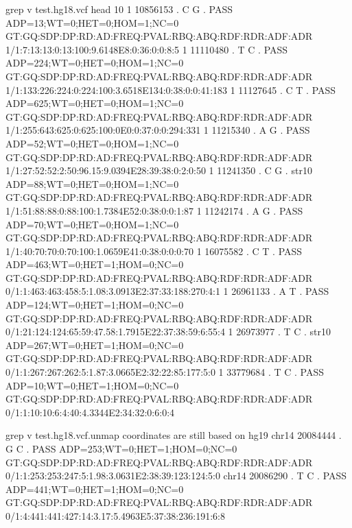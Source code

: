 \documentclass[letterpaper,10pt,english]{sphinxmanual}
\begin{document}
\begin{sphinxVerbatim}[commandchars=\\\{\}]
\PYGZdl{} grep \PYGZhy{}v \PYGZsq{}\PYGZsh{}\PYGZsq{} test.hg18.vcf  \textbar{}head \PYGZhy{}10
1      10856153        .       C       G       .       PASS    ADP=13;WT=0;HET=0;HOM=1;NC=0    GT:GQ:SDP:DP:RD:AD:FREQ:PVAL:RBQ:ABQ:RDF:RDR:ADF:ADR    1/1:7:13:13:0:13:100\PYGZpc{}:9.6148E\PYGZhy{}8:0:36:0:0:8:5
1      11110480        .       T       C       .       PASS    ADP=224;WT=0;HET=0;HOM=1;NC=0   GT:GQ:SDP:DP:RD:AD:FREQ:PVAL:RBQ:ABQ:RDF:RDR:ADF:ADR    1/1:133:226:224:0:224:100\PYGZpc{}:3.6518E\PYGZhy{}134:0:38:0:0:41:183
1      11127645        .       C       T       .       PASS    ADP=625;WT=0;HET=0;HOM=1;NC=0   GT:GQ:SDP:DP:RD:AD:FREQ:PVAL:RBQ:ABQ:RDF:RDR:ADF:ADR    1/1:255:643:625:0:625:100\PYGZpc{}:0E0:0:37:0:0:294:331
1      11215340        .       A       G       .       PASS    ADP=52;WT=0;HET=0;HOM=1;NC=0    GT:GQ:SDP:DP:RD:AD:FREQ:PVAL:RBQ:ABQ:RDF:RDR:ADF:ADR    1/1:27:52:52:2:50:96.15\PYGZpc{}:9.0394E\PYGZhy{}28:39:38:0:2:0:50
1      11241350        .       C       G       .       str10   ADP=88;WT=0;HET=0;HOM=1;NC=0    GT:GQ:SDP:DP:RD:AD:FREQ:PVAL:RBQ:ABQ:RDF:RDR:ADF:ADR    1/1:51:88:88:0:88:100\PYGZpc{}:1.7384E\PYGZhy{}52:0:38:0:0:1:87
1      11242174        .       A       G       .       PASS    ADP=70;WT=0;HET=0;HOM=1;NC=0    GT:GQ:SDP:DP:RD:AD:FREQ:PVAL:RBQ:ABQ:RDF:RDR:ADF:ADR    1/1:40:70:70:0:70:100\PYGZpc{}:1.0659E\PYGZhy{}41:0:38:0:0:0:70
1      16075582        .       C       T       .       PASS    ADP=463;WT=0;HET=1;HOM=0;NC=0   GT:GQ:SDP:DP:RD:AD:FREQ:PVAL:RBQ:ABQ:RDF:RDR:ADF:ADR    0/1:1:463:463:458:5:1.08\PYGZpc{}:3.0913E\PYGZhy{}2:37:33:188:270:4:1
1      26961133        .       A       T       .       PASS    ADP=124;WT=0;HET=1;HOM=0;NC=0   GT:GQ:SDP:DP:RD:AD:FREQ:PVAL:RBQ:ABQ:RDF:RDR:ADF:ADR    0/1:21:124:124:65:59:47.58\PYGZpc{}:1.7915E\PYGZhy{}22:37:38:59:6:55:4
1      26973977        .       T       C       .       str10   ADP=267;WT=0;HET=1;HOM=0;NC=0   GT:GQ:SDP:DP:RD:AD:FREQ:PVAL:RBQ:ABQ:RDF:RDR:ADF:ADR    0/1:1:267:267:262:5:1.87\PYGZpc{}:3.0665E\PYGZhy{}2:32:22:85:177:5:0
1      33779684        .       T       C       .       PASS    ADP=10;WT=0;HET=1;HOM=0;NC=0    GT:GQ:SDP:DP:RD:AD:FREQ:PVAL:RBQ:ABQ:RDF:RDR:ADF:ADR    0/1:1:10:10:6:4:40\PYGZpc{}:4.3344E\PYGZhy{}2:34:32:0:6:0:4

\PYGZdl{} grep \PYGZhy{}v \PYGZsq{}\PYGZsh{}\PYGZsq{} test.hg18.vcf.unmap      \PYGZsh{}coordinates are still based on hg19
chr14  20084444        .       G       C       .       PASS    ADP=253;WT=0;HET=1;HOM=0;NC=0   GT:GQ:SDP:DP:RD:AD:FREQ:PVAL:RBQ:ABQ:RDF:RDR:ADF:ADR    0/1:1:253:253:247:5:1.98\PYGZpc{}:3.0631E\PYGZhy{}2:38:39:123:124:5:0
chr14  20086290        .       T       C       .       PASS    ADP=441;WT=0;HET=1;HOM=0;NC=0   GT:GQ:SDP:DP:RD:AD:FREQ:PVAL:RBQ:ABQ:RDF:RDR:ADF:ADR    0/1:4:441:441:427:14:3.17\PYGZpc{}:5.4963E\PYGZhy{}5:37:38:236:191:6:8
\end{sphinxVerbatim}
\end{document}
